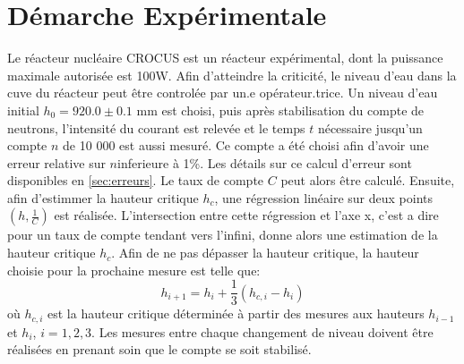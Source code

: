 \section{Démarche Expérimentale}

Le réacteur nucléaire CROCUS est un réacteur expérimental, dont la puissance maximale autorisée est 100W. Afin d'atteindre la criticité, le niveau d'eau dans la cuve du réacteur peut être controlée par un.e opérateur.trice. Un niveau d'eau initial \(h_0 = 920.0 \pm 0.1\) mm est choisi, puis après stabilisation du compte de neutrons, l'intensité du courant est relevée et le temps \(t\) nécessaire jusqu'un compte \(n\) de 10 000 est aussi mesuré. Ce compte a été choisi afin d'avoir une erreur relative sur \(n\)inferieure à 1\%. Les détails sur ce calcul d'erreur sont disponibles en \autoref{sec:erreurs}. Le taux de compte \(C\) peut alors être calculé. Ensuite, afin d'estimmer la hauteur critique \(h_c\), une régression linéaire sur deux points \((h, \frac{1}{C})\) est réalisée. L'intersection entre cette régression et l'axe x, c'est a dire pour un taux de compte tendant vers l'infini, donne alors une estimation de la hauteur critique \(h_c\). Afin de ne pas dépasser la hauteur critique, la hauteur choisie pour la prochaine mesure est telle que:
\begin{equation}
    h_{i+1} = h_i + \frac{1}{3}(h_{c,i} - h_i)
\end{equation}
où \(h_{c,i}\) est la hauteur critique déterminée à partir des mesures aux hauteurs \(h_{i-1}\) et \(h_{i}\), \(i=1,2,3\). Les mesures entre chaque changement de niveau doivent être réalisées en prenant soin que le compte se soit stabilisé.


